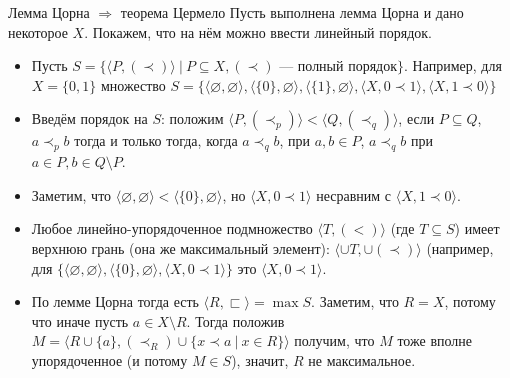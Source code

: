 \documentclass[aspectratio=169]{beamer}
\newtheorem{thm}{Теорема}[section]
\begin{document}
\begin{frame}{Лемма Цорна $\Rightarrow$ теорема Цермело}
Пусть выполнена лемма Цорна и дано некоторое $X$. Покажем, что на нём можно ввести линейный порядок.
\begin{itemize}
\item Пусть $S = \{ \langle P, (\prec)\rangle \ |\ P \subseteq X, (\prec)\text{ --- полный порядок} \}$.
Например, для $X = \{0,1\}$ множество
$S = \{
\langle\varnothing,\varnothing\rangle,
\langle \{0\},\varnothing\rangle,
\langle\{1\},\varnothing\rangle,
\langle X, 0 \prec 1\rangle,
\langle X, 1 \prec 0\rangle
\}$

\item Введём порядок на $S$: положим $\langle P, (\prec_p)\rangle < \langle Q, (\prec_q)\rangle$, если $P \subseteq Q$,
$a \prec_p b$ тогда и только тогда, когда $a \prec_q b$, при $a,b \in P$, $a \prec_q b$ при $a \in P, b \in Q\setminus P$.

\item Заметим, что $\langle \varnothing,\varnothing \rangle < \langle \{0\},\varnothing\rangle$,
но $\langle X, 0 \prec 1\rangle$ несравним с $\langle X, 1 \prec 0\rangle$.

\item Любое линейно-упорядоченное подмножество $\langle T, (<) \rangle$ (где $T \subseteq S$) имеет
верхнюю грань (она же максимальный элемент): $\langle \cup T, \cup(\prec)\rangle$ (например, 
для $\{\langle\varnothing,\varnothing\rangle,
\langle \{0\},\varnothing\rangle,
\langle X, 0 \prec 1\rangle\}$ это $\langle X, 0 \prec 1\rangle$.

\item По лемме Цорна тогда есть $\langle R, \sqsubset\rangle = \max S$. Заметим, что $R = X$, потому что иначе пусть
$a \in X\setminus R$. Тогда положив $M = \langle R\cup\{a\}, (\prec_R)\cup\{x\prec a\ |\ x \in R\} \rangle$
получим, что $M$ тоже вполне упорядоченное (и потому $M \in S$), значит, $R$ не максимальное.
\end{itemize}
\end{frame}
\end{document}
